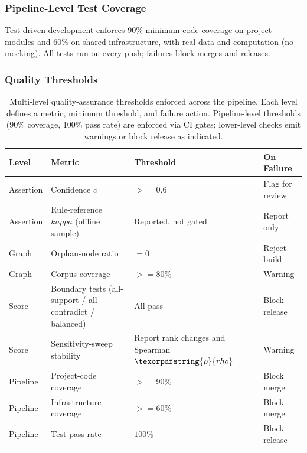 \documentclass[
  english,
]{article}
\begin{document}
\subsubsection{Pipeline-Level Test
Coverage}\label{pipeline-level-test-coverage}

Test-driven development enforces 90\% minimum code coverage on project
modules and 60\% on shared infrastructure, with real data and
computation (no mocking). All tests run on every push; failures block
merges and releases.

\subsubsection{Quality Thresholds}\label{quality-thresholds}

\begin{table}[H]
\centering
\caption{Multi-level quality-assurance thresholds enforced across the pipeline. Each level defines a metric, minimum threshold, and failure action. Pipeline-level thresholds (90\% coverage, 100\% pass rate) are enforced via CI gates; lower-level checks emit warnings or block release as indicated.}
\label{tab:quality_thresholds}
\begin{tabular}{llll}
\toprule
\textbf{Level} & \textbf{Metric} & \textbf{Threshold} & \textbf{On Failure} \\
\midrule
Assertion & Confidence $c$ & $>= 0.6$ & Flag for review \\
Assertion & Rule-reference $kappa$ (offline sample) & Reported, not gated & Report only \\
Graph & Orphan-node ratio & $= 0$ & Reject build \\
Graph & Corpus coverage & $>= 80\%$ & Warning \\
Score & Boundary tests (all-support / all-contradict / balanced) & All pass & Block release \\
Score & Sensitivity-sweep stability & Report rank changes and Spearman $\texorpdfstring{\ensuremath{\rho}}{rho}$ & Warning \\
Pipeline & Project-code coverage & $>= 90\%$ & Block merge \\
Pipeline & Infrastructure coverage & $>= 60\%$ & Block merge \\
Pipeline & Test pass rate & $100\%$ & Block release \\
\bottomrule
\end{tabular}
\end{table}

\FloatBarrier
\end{document}
